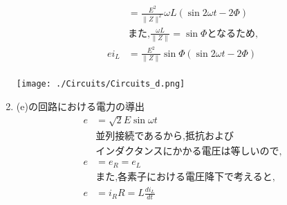 \documentclass[twocolumn]{article}
\begin{document}
\begin{enumerate}
\begin{align*}
               & = \frac{E^2}{\|Z\|^2}\omega L \left(\sin 2\omega t - 2\Phi\right)                                                                   \\
               & \text{また,} \frac{\omega L}{\|Z\|} = \sin \Phi \text{となるため,}                                                                         \\
          ei_L & = \frac{E^2}{\|Z\|}\sin \Phi \left(\sin 2\omega t - 2\Phi\right)                                                                    \\
        \end{align*}

        \begin{center}
          \texttt{[image: ./Circuits/Circuits\_d.png]}
        \end{center}

  \item (e)の回路における電力の導出
        \begin{align*}
          e & =\sqrt{2}E\sin\omega t      \\
            & \text{並列接続であるから,抵抗および}      \\
            & \text{インダクタンスにかかる電圧は等しいので,} \\
          e & = e_R = e_L                 \\
            & \text{また,各素子における電圧降下で考えると,} \\
          e & = {i_R}R = L\frac{di_L}{dt} \\
        \end{align*}


\end{enumerate}
\end{document}
